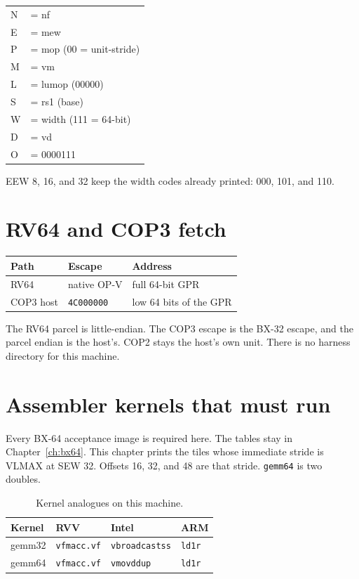 \vspace{1.4ex}
\begin{center}
\begin{tabular}{@{}ll@{}}
N & = nf \\
E & = mew \\
P & = mop (00 = unit-stride) \\
M & = vm \\
L & = lumop (00000) \\
S & = rs1 (base) \\
W & = width (111 = 64-bit) \\
D & = vd \\
O & = 0000111 \\
\end{tabular}
\end{center}

EEW 8, 16, and 32 keep the width codes already printed: 000, 101, and 110.

\section{RV64 and COP3 fetch}

\begin{center}
\begin{tabular}{@{}lll@{}}
\toprule
Path & Escape & Address \\
\midrule
RV64 & native OP-V & full 64-bit GPR \\
COP3 host & \texttt{4C000000} & low 64 bits of the GPR \\
\bottomrule
\end{tabular}
\end{center}

The RV64 parcel is little-endian. The COP3 escape is the BX-32 escape, and the parcel endian is the host's. COP2 stays the host's own unit. There is no harness directory for this machine.

\section{Assembler kernels that must run}

Every BX-64 acceptance image is required here. The tables stay in Chapter~\ref{ch:bx64}. This chapter prints the tiles whose immediate stride is VLMAX at SEW 32. Offsets 16, 32, and 48 are that stride. \texttt{gemm64} is two doubles.

\begin{table}[htbp]
\centering
\caption{Kernel analogues on this machine.}
\small
\begin{tabular}{@{}llll@{}}
\toprule
Kernel & RVV & Intel & ARM \\
\midrule
gemm32 & \texttt{vfmacc.vf} & \texttt{vbroadcastss} & \texttt{ld1r} \\
gemm64 & \texttt{vfmacc.vf} & \texttt{vmovddup} & \texttt{ld1r} \\
\bottomrule
\end{tabular}
\end{table}

